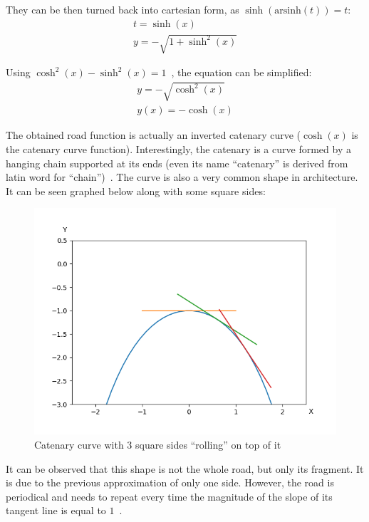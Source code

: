 \documentclass[12pt]{article}
\begin{document}
        They can be then turned back into cartesian form, as $\sinh(\text{arsinh}(t)) = t$:
        \begin{align}
            t = \sinh(x) \\
            y = -\sqrt{1+\sinh^2(x)}
        \end{align}

        Using $\cosh^2(x) - \sinh^2(x) = 1$~\cite{oxford_dict}, the equation can be simplified:
        \begin{align}
            y = -\sqrt{\cosh^2(x)} \\
            y(x) = -\cosh(x)
        \end{align}

        The obtained road function is actually an inverted catenary curve ($\cosh(x)$ is the catenary curve function). Interestingly, the catenary is a curve formed by a hanging chain supported at its ends (even its name ``catenary'' is derived from latin word for ``chain'')~\cite{mathworld_catenary}. The curve is also a very common shape in architecture. It can be seen graphed below along with some square sides:
        
        \begin{figure}[H]
            \centering
            \includegraphics[width=0.75\linewidth]{images/cosh_many.png}
            \caption[Catenary curve with 3 square sides]{Catenary curve with 3 square sides ``rolling'' on top of it\footnotemark}\label{fig:cosh}
        \end{figure}

        It can be observed that this shape is not the whole road, but only its fragment. It is due to the previous approximation of only one side. However, the road is periodical and needs to repeat every time the magnitude of the slope of its tangent line is equal to $1$~\cite{Hall_Wagon_1992}.
\end{document}
